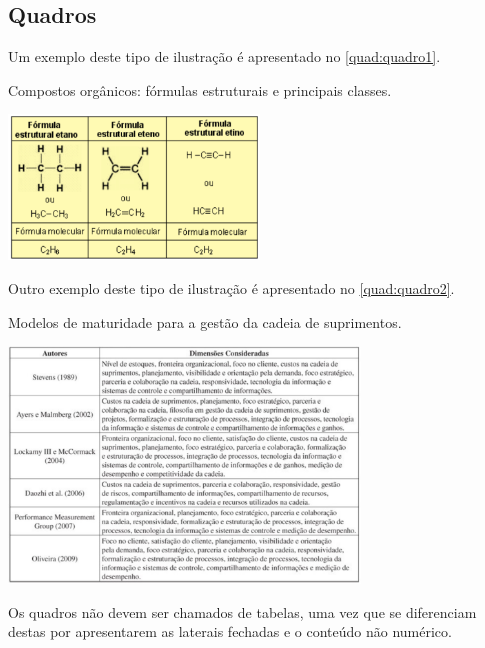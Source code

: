 \subsection{Quadros}\label{sec:quadros}

Um exemplo deste tipo de ilustração é apresentado no \autoref{quad:quadro1}.

\begin{tabframed}[htb]%
\captionsetup{width=0.5\textwidth}%
\caption{Compostos orgânicos: fórmulas estruturais e principais classes.}%
\label{quad:quadro1}%
\includegraphics[width=0.5\textwidth]{./CapituloExemplo/quadro1}%
\end{tabframed}

Outro exemplo deste tipo de ilustração é apresentado no \autoref{quad:quadro2}.

\begin{tabframed}[htb]%
\captionsetup{width=0.7\textwidth}%
\caption{Modelos de maturidade para a gestão da cadeia de suprimentos.}%
\label{quad:quadro2}%
\includegraphics[width=0.7\textwidth]{./CapituloExemplo/quadro2}%
\end{tabframed}

Os quadros não devem ser chamados de tabelas, uma vez que se diferenciam destas por apresentarem as laterais fechadas e o conteúdo não numérico.

